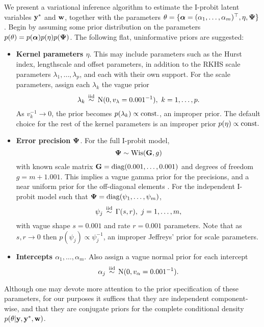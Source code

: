 We present a variational inference algorithm to estimate the I-probit latent variables ${\mathbf y}^*$ and ${\mathbf w}$, together with the parameters $\theta = \{{\bm\alpha} = (\alpha_1,\dots,\alpha_m)^\top,\eta,{\bm\Psi} \}$.
Begin by assuming some prior distribution on the parameters $p(\theta) = p({\bm\alpha})p(\eta)p({\bm\Psi})$. 
The following flat, uninformative priors are suggested:
\begin{itemize}
  \item \textbf{Kernel parameters $\eta$}. This may include parameters such as the Hurst index, lengthscale and offset parameters, in addition to the RKHS scale parameters $\lambda_1,\dots,\lambda_p$, and each with their own support.
  For the scale parameters, assign each $\lambda_k$ the vague prior
  \[
    \lambda_k \,\overset{\text{iid}}{\sim}\, \operatorname{N}(0,v_\lambda = 0.001^{-1}), \ k=1,\dots,p.
  \]
  As $v_k^{-1}\to 0$, the prior becomes $p(\lambda_k)\propto \text{const.}\hspace{0.01em}$, an improper prior.
  The default choice for the rest of the kernel parameters is an improper prior $p(\eta) \propto \text{const.}\hspace{0.01em}$
  \item \textbf{Error precision ${\bm\Psi}$}. For the full I-probit model,
  \[
    {\bm\Psi} \sim \operatorname{Wis}({\mathbf G},g)
  \]
  with known scale matrix ${\mathbf G} = \operatorname{diag}(0.001,\dots,0.001)$ and degrees of freedom $g=m+1.001$. 
  This implies a vague gamma prior for the precisions, and a near uniform prior for the off-diagonal elements \citep{alvarez2014bayesian}.
  For the independent I-probit model such that ${\bm\Psi} = \operatorname{diag}(\psi_1,\dots,\psi_m)$,
  \[
    \psi_j \,\overset{\text{iid}}{\sim}\, \Gamma(s,r), \ j=1,\dots,m,
  \]
  with vague shape $s = 0.001$ and rate $r = 0.001$ parameters. Note that as $s,r \to 0$ then $p(\psi_j) \propto \psi_j^{-1}$, an improper Jeffreys' prior for scale parameters.
  \item \textbf{Intercepts $\alpha_1,\dots,\alpha_m$}. Also assign a vague normal prior for each intercept
  \[
    \alpha_j \,\overset{\text{iid}}{\sim}\, \operatorname{N}(0,v_\alpha=0.001^{-1}).
  \]
\end{itemize}
Although one may devote more attention to the prior specification of these parameters, for our purposes it suffices that they are independent component-wise, and that they are conjugate priors for the complete conditional density $p(\theta|{\mathbf y},{\mathbf y}^*,{\mathbf w})$.

